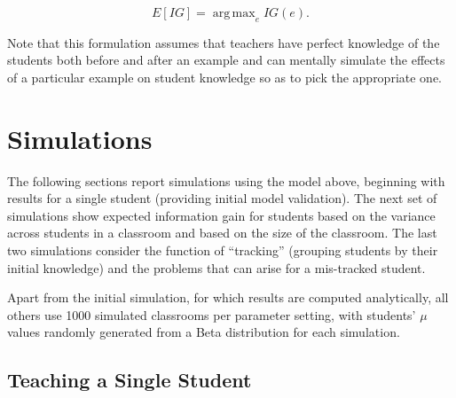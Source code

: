 \documentclass[10pt,letterpaper]{article}
\DeclareMathOperator*{\argmax}{arg\,max}
\begin{document}
\begin{equation}
E[IG] = \argmax_e {IG(e)}.
\end{equation}

\noindent Note that this formulation assumes that teachers have perfect knowledge of the students both before and after an example and can mentally simulate the effects of a particular example on student knowledge so as to pick the appropriate one. 

 \section{Simulations}

The following sections report simulations using the model above, beginning with results for a single student (providing initial model validation). The next set of simulations show expected information gain for students based on the variance across students in a classroom and based on the size of the classroom. The last two simulations consider the function of ``tracking'' (grouping students by their initial knowledge) and the problems that can arise for a mis-tracked student. 

Apart from the initial simulation, for which results are computed analytically, all others use 1000 simulated classrooms per parameter setting, with students' $\mu$ values randomly generated from a Beta distribution for each simulation.

\subsection{Teaching a Single Student}
\end{document}
